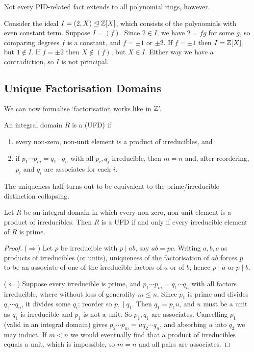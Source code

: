 \documentclass[a4paper]{scrartcl}
\begin{document}
Not every PID-related fact extends to all polynomial rings, however.

\begin{example}
	Consider the ideal $I = (2, X) \trianglelefteq \mathbb{Z}[X]$, which consists of the polynomials with even constant term. Suppose $I = (f)$. Since $2 \in I$, we have $2 = fg$ for some $g$, so comparing degrees $f$ is a constant, and $f = \pm 1$ or $\pm 2$. If $f = \pm 1$ then $I = \mathbb{Z}[X]$, but $1 \notin I$. If $f = \pm 2$ then $X \notin (f)$, but $X \in I$. Either way we have a contradiction, so $I$ is not principal.
\end{example}

\subsection{Unique Factorisation Domains}

We can now formalise `factorisation works like in $\mathbb{Z}$'.

\begin{definition}
	An integral domain $R$ is a  (UFD) if
	\begin{enumerate}[label=(\roman*)]
		\item every non-zero, non-unit element is a product of irreducibles, and
		\item if $p_1 \cdots p_m = q_1 \cdots q_n$ with all $p_i, q_j$ irreducible, then $m = n$ and, after reordering, $p_i$ and $q_i$ are associates for each $i$.
	\end{enumerate}
\end{definition}

The uniqueness half turns out to be equivalent to the prime/irreducible distinction collapsing.

\begin{proposition}
	Let $R$ be an integral domain in which every non-zero, non-unit element is a product of irreducibles. Then $R$ is a UFD if and only if every irreducible element of $R$ is prime.
\end{proposition}
\begin{proof}
	($\Rightarrow$) Let $p$ be irreducible with $p \mid ab$, say $ab = pc$. Writing $a, b, c$ as products of irreducibles (or units), uniqueness of the factorisation of $ab$ forces $p$ to be an associate of one of the irreducible factors of $a$ or of $b$; hence $p \mid a$ or $p \mid b$.

	($\Leftarrow$) Suppose every irreducible is prime, and $p_1 \cdots p_m = q_1 \cdots q_n$ with all factors irreducible, where without loss of generality $m \leq n$. Since $p_1$ is prime and divides $q_1 \cdots q_n$, it divides some $q_i$; reorder so $p_1 \mid q_1$. Then $q_1 = p_1 u$, and $u$ must be a unit as $q_1$ is irreducible and $p_1$ is not a unit. So $p_1, q_1$ are associates. Cancelling $p_1$ (valid in an integral domain) gives $p_2 \cdots p_m = u q_2 \cdots q_n$, and absorbing $u$ into $q_2$ we may induct. If $m < n$ we would eventually find that a product of irreducibles equals a unit, which is impossible, so $m = n$ and all pairs are associates.
\end{proof}
\end{document}
